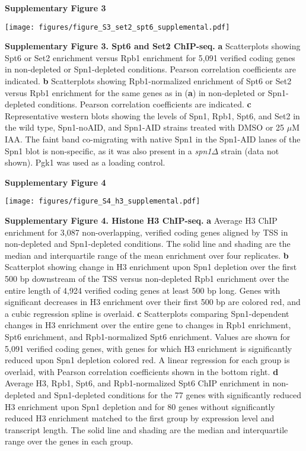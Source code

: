 \documentclass[8pt]{extarticle}
\begin{document}
\newpage

\textbf{\large Supplementary Figure 3}

{\texttt{[image: figures/figure\_S3\_set2\_spt6\_supplemental.pdf]}\par}

\textbf{Supplementary Figure 3. Spt6 and Set2 ChIP-seq.}
\textbf{a} Scatterplots showing Spt6 or Set2 enrichment versus Rpb1 enrichment for 5,091 verified coding genes in non-depleted or Spn1-depleted conditions.
Pearson correlation coefficients are indicated.
\textbf{b} Scatterplots showing Rpb1-normalized enrichment of Spt6 or Set2 versus Rpb1 enrichment for the same genes as in (\textbf{a}) in non-depleted or Spn1-depleted conditions.
Pearson correlation coefficients are indicated.
\textbf{c} Representative western blots showing the levels of Spn1, Rpb1, Spt6, and Set2 in the wild type, Spn1-noAID, and Spn1-AID strains treated with DMSO or 25 $\mu$M IAA.
The faint band co-migrating with native Spn1 in the Spn1-AID lanes of the Spn1 blot is non-specific, as it was also present in a \textit{spn1$\Delta$} strain (data not shown).
Pgk1 was used as a loading control.

\newpage

\textbf{\large Supplementary Figure 4}

{\texttt{[image: figures/figure\_S4\_h3\_supplemental.pdf]}\par}

\textbf{Supplementary Figure 4. Histone H3 ChIP-seq.}
\textbf{a} Average H3 ChIP enrichment for 3,087 non-overlapping, verified coding genes aligned by TSS in non-depleted and Spn1-depleted conditions.
The solid line and shading are the median and interquartile range of the mean enrichment over four replicates.
\textbf{b} Scatterplot showing change in H3 enrichment upon Spn1 depletion over the first 500 bp downstream of the TSS versus non-depleted Rpb1 enrichment over the entire length of 4,924 verified coding genes at least 500 bp long.
Genes with significant decreases in H3 enrichment over their first 500 bp are colored red, and a cubic regression spline is overlaid.
\textbf{c} Scatterplots comparing Spn1-dependent changes in H3 enrichment over the entire gene to changes in Rpb1 enrichment, Spt6 enrichment, and Rpb1-normalized Spt6 enrichment.
Values are shown for 5,091 verified coding genes, with genes for which H3 enrichment is significantly reduced upon Spn1 depletion colored red.
A linear regression for each group is overlaid, with Pearson correlation coefficients shown in the bottom right.
\textbf{d} Average H3, Rpb1, Spt6, and Rpb1-normalized Spt6 ChIP enrichment in non-depleted and Spn1-depleted conditions for the 77 genes with significantly reduced H3 enrichment upon Spn1 depletion and for 80 genes without significantly reduced H3 enrichment matched to the first group by expression level and transcript length.
The solid line and shading are the median and interquartile range over the genes in each group.
\end{document}
